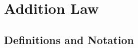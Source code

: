 \documentclass[english,11pt,a4paper]{article}
\begin{document}








\newpage

\section{Addition Law}\label{ch1}

\subsection{Definitions and Notation}
\end{document}
